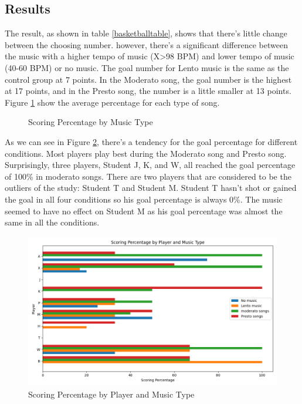 \documentclass[man,floatsintext]{apa7}
\begin{document}
\subsection{Results}

The result, as shown in table \ref{basketballtable}, shows that there's little change between the choosing number. however, there's a significant difference between the music with a higher tempo of music (X>98 BPM) and lower tempo of music (40-60 BPM) or no music. The goal number for Lento music is the same as the control group at 7 points. In the Moderato song, the goal number is the highest at 17 points, and in the Presto song, the number is a little smaller at 13 points. Figure \ref{scoring_percentage} show the average percentage for each type of song.

\begin{figure}[h]
\centering
\caption{Scoring Percentage by Music Type}
\label{scoring_percentage}
\end{figure}


As we can see in Figure \ref{scoreperc}, there's a tendency for the goal percentage for different conditions. Most players play best during the Moderato song and Presto song. Surprisingly, three players, Student J, K, and W, all reached the goal percentage of 100\% in moderato songs. There are two players that are considered to be the outliers of the study: Student T and Student M. Student T hasn't shot or gained the goal in all four conditions so his goal percentage is always 0\%. The music seemed to have no effect on Student M as his goal percentage was almost the same in all the conditions.

\begin{figure}[h]
\centering
\includegraphics[width=\textwidth]{out.png}
\caption{Scoring Percentage by Player and Music Type}
\label{scoreperc}
\end{figure}
\end{document}
